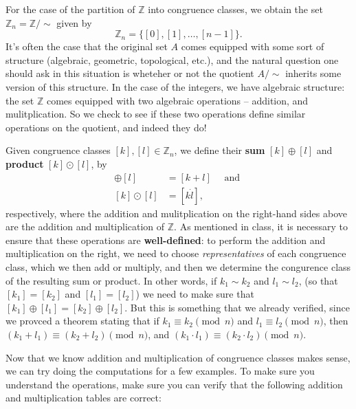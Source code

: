 \documentclass[letterpaper,12pt]{article}
\newcommand{\Z}{\mathbb{Z}}
\newcommand{\modd}[3]{#1 \equiv #2 \pmod{#3}}
\begin{document}
\bigskip

For the case of the partition of $\Z$ into congruence classes, we obtain the set $\Z_n =\Z/\!\!\sim$ given by
\[
 \Z_n = \{[0],[1],\ldots, [n-1]\}.
\]
It's often the case that the original set $A$ comes equipped with some sort of structure (algebraic, geometric, topological, etc.), and the natural question one should ask in this situation is wheteher or not the quotient $A/\!\!\sim$ inherits some version of this structure. In the case of the integers, we have algebraic structure: the set $\Z$ comes equipped with two algebraic operations -- addition, and mulitplication. So we check to see if these two operations define similar operations on the quotient, and indeed they do!

Given congruence classes $[k],[l]\in\Z_n$, we define their {\bf sum} $[k]\oplus [l]$ and {\bf product} $[k]\odot [l]$, by
\begin{align*}
 [k]\oplus [l] & = [k+l] \quad \text{ and }\\
 [k]\odot [l] & = [k\dot l],
\end{align*}
respectively, where the addition and mulitplication on the right-hand sides above are the addition and multiplication of $\Z$. As mentioned in class, it is necessary to ensure that these operations are {\bf well-defined}: to perform the addition and multiplication on the right, we need to choose {\em representatives} of each congruence class, which we then add or multiply, and then we determine the congurence class of the resulting sum or product. In other words, if $k_1\sim k_2$ and $l_1\sim l_2$, (so that $[k_1]=[k_2]$ and $[l_1]=[l_2]$) we need to make sure that $[k_1]\oplus [l_1] = [k_2]\oplus [l_2]$. But this is something that we already verified, since we provced a theorem stating that if $\modd{k_1}{k_2}{n}$ and $\modd{l_1}{l_2}{n}$, then $\modd{(k_1+l_1)}{(k_2+l_2)}{n}$, and $\modd{(k_1\cdot l_1)}{(k_2\cdot l_2)}{n}$.

Now that we know addition and multiplication of congruence classes makes sense, we can try doing the computations for a few examples. To make sure you understand the operations, make sure you can verify that the following addition and multiplication tables are correct:
\pagebreak
\end{document}
